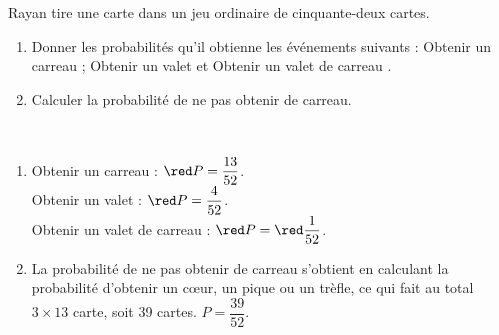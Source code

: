 \begin{exercice*}
    Rayan tire une carte dans un jeu ordinaire de cinquante-deux cartes.
    \begin{enumerate}
       \item Donner les probabilités qu'il obtienne les événements suivants : \og Obtenir un carreau \fg ; \og Obtenir un valet \fg{} et \og Obtenir un valet de carreau \fg.
       \item Calculer la probabilité de ne pas obtenir de carreau.
    \end{enumerate}
\end{exercice*}
\begin{corrige}
    \ \\ [-5mm]
    \begin{enumerate}
       \item Obtenir un carreau : ${\red P =\dfrac{13}{52}}$. \\
          Obtenir un valet : ${\red P =\dfrac{4}{52}}$. \\
          Obtenir un valet de carreau  : ${\red P =\red \dfrac{1}{52}}$. \smallskip
       \item La probabilité de ne pas obtenir de carreau s'obtient en calculant la probabilité d'obtenir un c\oe ur, un pique ou un trèfle, ce qui fait au total $3\times13$ carte, soit 39 cartes. {\red $P =\dfrac{39}{52}$}.
    \end{enumerate} 
\end{corrige}    